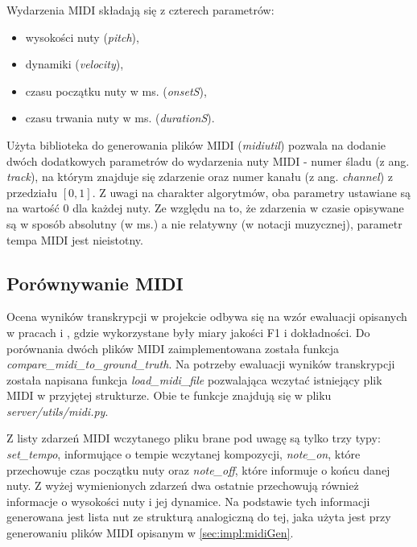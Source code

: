 \documentclass[12pt,a4paper,twoside]{mwart}
\begin{document}
Wydarzenia MIDI składają się z czterech parametrów:
\begin{itemize}
  \item wysokości nuty (\textit{pitch}),
  \item dynamiki (\textit{velocity}),
  \item czasu początku nuty w ms. (\textit{onsetS}),
  \item czasu trwania nuty w ms. (\textit{durationS}).
\end{itemize}
Użyta biblioteka do generowania plików MIDI (\textit{midiutil}) pozwala na dodanie dwóch dodatkowych parametrów do wydarzenia nuty MIDI - numer śladu (z ang. \textit{track}), na którym znajduje się zdarzenie oraz numer kanału (z ang. \textit{channel}) z przedziału $\left[0, 1\right]$. Z uwagi na charakter algorytmów, oba parametry ustawiane są na wartość $0$ dla każdej nuty. Ze względu na to, że zdarzenia w czasie opisywane są w sposób absolutny (w ms.) a nie relatywny (w notacji muzycznej), parametr tempa MIDI jest nieistotny.

\subsection{Porównywanie MIDI}\label{sec:impl:midiCompare}
Ocena wyników transkrypcji w projekcie odbywa się na wzór ewaluacji opisanych w pracach 
\cite[107]{Transcription:Pertus:Inharmonicity} 
i 
\cite[8]{Transcription:Pertus:Inharmonicity2}
, gdzie wykorzystane były miary jakości F1 i dokładności. Do porównania dwóch plików MIDI zaimplementowana została funkcja \mbox{\textit{compare\_midi\_to\_ground\_truth}}. Na potrzeby ewaluacji wyników transkrypcji została napisana funkcja \mbox{\textit{load\_midi\_file}} pozwalająca wczytać istniejący plik MIDI w przyjętej strukturze. Obie te funkcje znajdują się w pliku \mbox{\textit{server/utils/midi.py}}.

Z listy zdarzeń MIDI wczytanego pliku brane pod uwagę są tylko trzy typy: \mbox{\textit{set\_tempo}}, informujące o tempie wczytanej kompozycji, \mbox{\textit{note\_on}}, które przechowuje czas początku nuty oraz \mbox{\textit{note\_off}}, które informuje o końcu danej nuty. Z wyżej wymienionych zdarzeń dwa ostatnie przechowują również informacje o wysokości nuty i jej dynamice. Na podstawie tych informacji generowana jest lista nut ze strukturą analogiczną do tej, jaka użyta jest przy generowaniu plików MIDI opisanym w \ref{sec:impl:midiGen}.
\end{document}
